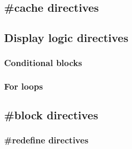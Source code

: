 \subsection{\#cache directives}


\subsection{Display logic directives}

\subsubsection{Conditional blocks}

\subsubsection{For loops}

\subsection{\#block directives}

\subsubsection{\#redefine directives}


